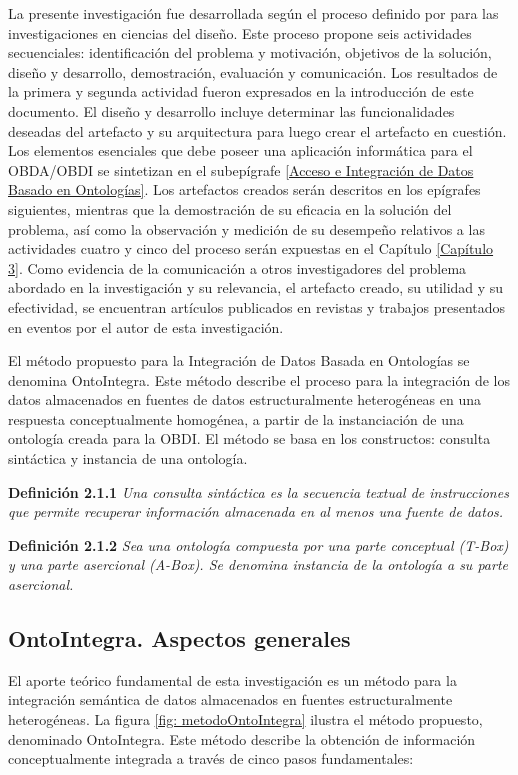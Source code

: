 La presente investigación fue desarrollada según el proceso definido por \cite{Peffers2006} para las investigaciones en ciencias del diseño. Este proceso propone seis actividades secuenciales: identificación del problema y motivación, objetivos de la solución, diseño y desarrollo, demostración, evaluación y comunicación. Los resultados de la primera y segunda actividad fueron expresados en la introducción de este documento. El diseño y desarrollo incluye determinar las funcionalidades deseadas del artefacto y su arquitectura para luego crear el artefacto en cuestión. Los elementos esenciales que debe poseer una aplicación informática para el OBDA/OBDI se sintetizan en el subepígrafe \ref{Acceso e Integración de Datos Basado en Ontologías}. Los artefactos
creados serán descritos en los epígrafes siguientes, mientras que la demostración de su eficacia en la solución del problema, así como la observación y medición de su desempeño relativos a las actividades cuatro y cinco del proceso serán expuestas en el Capítulo \ref{Capítulo 3}. Como evidencia de la comunicación a otros investigadores del problema abordado en la investigación y su relevancia, el artefacto creado, su utilidad y su efectividad, se encuentran artículos publicados en revistas y trabajos presentados en eventos por el autor de esta investigación.

El método propuesto para la Integración de Datos Basada en Ontologías se denomina OntoIntegra. Este método describe el proceso para la integración de los datos almacenados en fuentes de datos estructuralmente heterogéneas en una respuesta conceptualmente homogénea, a partir de la instanciación de una ontología creada para la OBDI. El método se basa en los constructos: consulta sintáctica y instancia de una ontología.

\textbf{Definición 2.1.1} \textit{Una consulta sintáctica es la secuencia textual de instrucciones que permite recuperar información almacenada en al menos una fuente de datos.}

\textbf{Definición 2.1.2} \textit{Sea una ontología compuesta por una parte conceptual (T-Box) y una parte asercional (A-Box). Se denomina instancia de la ontología a su parte asercional.}

\subsection{OntoIntegra. Aspectos generales}
El aporte teórico fundamental de esta investigación es un método para la integración semántica de datos almacenados en fuentes estructuralmente heterogéneas. La figura \ref{fig: metodoOntoIntegra} ilustra el método propuesto, denominado OntoIntegra. Este método describe la obtención de información conceptualmente integrada a través de cinco pasos fundamentales:

